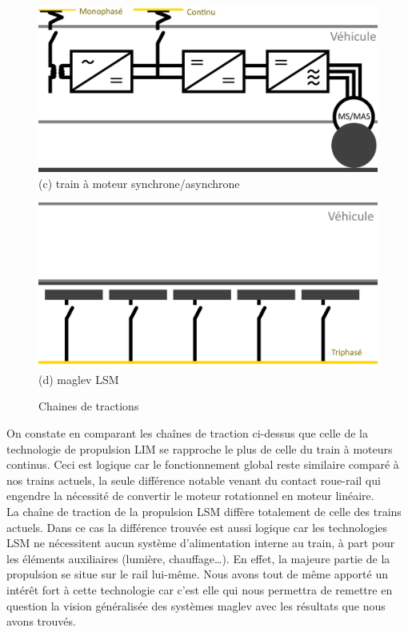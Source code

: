 \documentclass[12pt, a4paper, onecolumn]{article}
\renewcommand{\tab}{\tabto{15px}}
\begin{document}
\begin{figure}[H]
  \begin{minipage}[H]{0.47\textwidth}
    \includegraphics[width=\textwidth]{img/CTAtrain.png}
    \;(c) train à moteur synchrone/asynchrone
  \end{minipage}
  \hfill
  \begin{minipage}[H]{0.47\textwidth}
    \includegraphics[width=\textwidth]{img/CTALSM.png}
    \;(d) maglev LSM
  \end{minipage}
  \caption{Chaines de tractions}
\end{figure}

\tab On constate en comparant les chaînes de traction ci-dessus que celle de la technologie de propulsion LIM se rapproche le plus de celle du train à moteurs continus.
Ceci est logique car le fonctionnement global reste similaire comparé à nos trains actuels, la seule différence notable venant du contact roue-rail qui engendre la nécessité de convertir le moteur rotationnel en moteur linéaire. \\
\linebreak
\tab La chaîne de traction de la propulsion LSM diffère totalement de celle des trains actuels.
Dans ce cas la différence trouvée est aussi logique car les technologies LSM ne nécessitent aucun système d'alimentation interne au train, à part pour les éléments auxiliaires (lumière, chauffage…).
En effet, la majeure partie de la propulsion se situe sur le rail lui-même.
Nous avons tout de même apporté un intérêt fort à cette technologie car c’est elle qui nous permettra de remettre en question la vision généralisée des systèmes maglev avec les résultats que nous avons trouvés.\\
\end{document}
